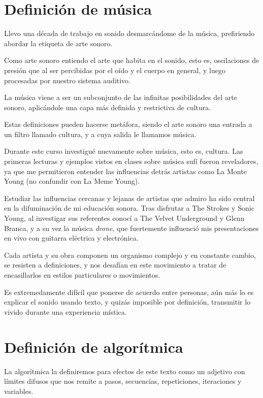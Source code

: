 \documentclass{article}
\begin{document}
\section{Definición de música}

Llevo una década de trabajo en sonido desmarcándome de la música, prefiriendo abordar la etiqueta de arte sonoro.

Como arte sonoro entiendo el arte que habita en el sonido, esto es, oscilaciones de presión que al ser percibidas por el oído y el cuerpo en general, y luego procesadas por nuestro sistema auditivo.

La música viene a ser un subconjunto de las infinitas posibilidades del arte sonoro, aplicándole una capa más definida y restrictiva de cultura.

Estas definiciones pueden hacerse metáfora, siendo el arte sonoro una entrada a un filtro llamado cultura, y a cuya salida le llamamos música.

Durante este curso investigué nuevamente sobre música, esto es, cultura. Las primeras lecturas y ejemplos vistos en clases sobre música sufí fueron reveladores, ya que me permitieron entender las influencias detrás artistas como La Monte Young (no confundir con La Meme Young).

Estudiar las influencias cercanas y lejanas de artistas que admiro ha sido central en la difuminación de mi educación sonora. Tras disfrutar a The Strokes y Sonic Young, al investigar sus referentes conocí a The Velvet Underground y Glenn Branca, y a su vez la música \textit{drone}, que fuertemente influenció mis presentaciones en vivo con guitarra eléctrica y electrónica.

Cada artista y su obra componen un organismo complejo y en constante cambio, se resisten a definiciones, y nos desafían en este movimiento a tratar de encasillarlos en estilos particulares o movimientos.

Es extremedamente difícil que ponerse de acuerdo entre personas, aún más lo es explicar el sonido usando texto, y quizás imposible por definición, transmitir lo vivido durante una experiencia mística.

\clearpage

\section{Definición de algorítmica}

La algorítmica la definiremos para efectos de este texto como un adjetivo con límites difusos que nos remite a pasos, secuencias, repeticiones, iteraciones y variables.
\end{document}
